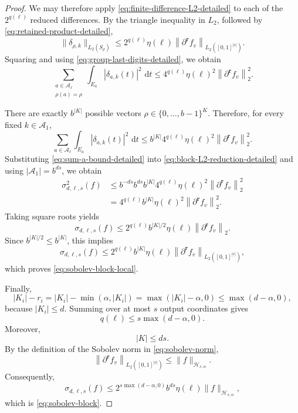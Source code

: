 \documentclass[10pt,a4paper]{amsart}
\newcommand{\dd}{\,\mathrm d}
\begin{document}
\begin{proof}
We may therefore apply
\eqref{eq:finite-difference-L2-detailed} to each of the
$2^{q(\boldsymbol\ell)}$ reduced differences.  By the triangle
inequality in $L_2$, followed by
\eqref{eq:retained-product-detailed},
\begin{equation}\label{eq:delta-L2-detailed}
 \|\delta_{\rho,k}\|_{L_2(S_\rho)}
 \le
 2^{q(\boldsymbol\ell)}
 \eta(\boldsymbol\ell)
 \left\|
   \partial^{\boldsymbol r}f_v
 \right\|_{L_2([0,1]^{|v|})}.
\end{equation}
Squaring and using
\eqref{eq:group-last-digits-detailed}, we obtain
\[
 \sum_{\substack{
 a\in\mathcal A_{\boldsymbol\ell}\\
 \rho(a)=\rho}}
 \int_{E_a}|\delta_{a,k}(t)|^2\,\dd t
 \le
 4^{q(\boldsymbol\ell)}
 \eta(\boldsymbol\ell)^2
 \left\|
   \partial^{\boldsymbol r}f_v
 \right\|_2^2.
\]

There are exactly $b^{|K|}$ possible vectors
$\rho\in\{0,\ldots,b-1\}^{K}$.  Therefore, for every fixed
$k\in\mathcal A_1$,
\begin{equation}\label{eq:sum-a-bound-detailed}
 \sum_{a\in\mathcal A_{\boldsymbol\ell}}
 \int_{E_a}|\delta_{a,k}(t)|^2\,\dd t
 \le
 b^{|K|}
 4^{q(\boldsymbol\ell)}
 \eta(\boldsymbol\ell)^2
 \left\|
   \partial^{\boldsymbol r}f_v
 \right\|_2^2.
\end{equation}
Substituting \eqref{eq:sum-a-bound-detailed} into
\eqref{eq:block-L2-reduction-detailed} and using
$|\mathcal A_1|=b^{ds}$, we obtain
\begin{align*}
 \sigma_{d,\boldsymbol\ell,s}^2(f)
 &\le
 b^{-ds}b^{ds}b^{|K|}
 4^{q(\boldsymbol\ell)}
 \eta(\boldsymbol\ell)^2
 \left\|
   \partial^{\boldsymbol r}f_v
 \right\|_2^2\\
 &=
 4^{q(\boldsymbol\ell)}b^{|K|}
 \eta(\boldsymbol\ell)^2
 \left\|
   \partial^{\boldsymbol r}f_v
 \right\|_2^2.
\end{align*}
Taking square roots yields
\begin{equation}\label{eq:sobolev-block-local-strong-detailed}
 \sigma_{d,\boldsymbol\ell,s}(f)
 \le
 2^{q(\boldsymbol\ell)}b^{|K|/2}
 \eta(\boldsymbol\ell)
 \left\|
   \partial^{\boldsymbol r}f_v
 \right\|_2.
\end{equation}
Since $b^{|K|/2}\le b^{|K|}$, this implies
\[
 \sigma_{d,\boldsymbol\ell,s}(f)
 \le
 2^{q(\boldsymbol\ell)}b^{|K|}
 \eta(\boldsymbol\ell)
 \left\|
   \partial^{\boldsymbol r}f_v
 \right\|_{L_2([0,1]^{|v|})},
\]
which proves \eqref{eq:sobolev-block-local}.

Finally,
\[
 |K_i|-r_i
 =
 |K_i|-\min(\alpha,|K_i|)
 =
 \max(|K_i|-\alpha,0)
 \le
 \max(d-\alpha,0),
\]
because $|K_i|\le d$.  Summing over at most $s$ output coordinates
gives
\[
 q(\boldsymbol\ell)
 \le
 s\max(d-\alpha,0).
\]
Moreover,
\[
 |K|\le ds.
\]
By the definition of the Sobolev norm in
\eqref{eq:sobolev-norm},
\[
 \left\|
   \partial^{\boldsymbol r}f_v
 \right\|_{L_2([0,1]^{|v|})}
 \le
 \|f\|_{\mathcal H_{s,\alpha}}.
\]
Consequently,
\[
 \sigma_{d,\boldsymbol\ell,s}(f)
 \le
 2^{s\max(d-\alpha,0)}
 b^{ds}
 \eta(\boldsymbol\ell)
 \|f\|_{\mathcal H_{s,\alpha}},
\]
which is \eqref{eq:sobolev-block}.
\end{proof}
\end{document}
